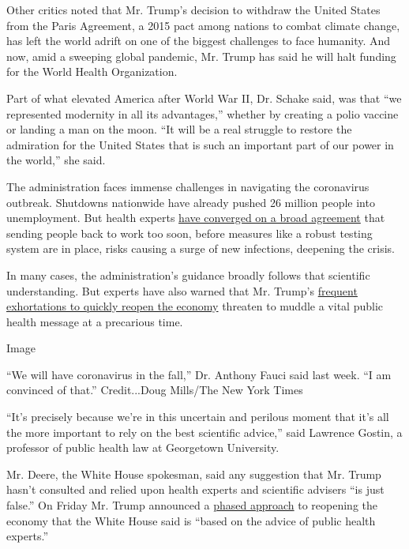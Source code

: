 Other critics noted that Mr. Trump's decision to withdraw the United
States from the Paris Agreement, a 2015 pact among nations to combat
climate change, has left the world adrift on one of the biggest
challenges to face humanity. And now, amid a sweeping global pandemic,
Mr. Trump has said he will halt funding for the World Health
Organization.

Part of what elevated America after World War II, Dr. Schake said, was
that ``we represented modernity in all its advantages,'' whether by
creating a polio vaccine or landing a man on the moon. ``It will be a
real struggle to restore the admiration for the United States that is
such an important part of our power in the world,'' she said.

The administration faces immense challenges in navigating the
coronavirus outbreak. Shutdowns nationwide have already pushed 26
million people into unemployment. But health experts
\href{https://www.nytimes3xbfgragh.onion/2020/04/06/upshot/coronavirus-four-benchmarks-reopening.html}{have
converged on a broad agreement} that sending people back to work too
soon, before measures like a robust testing system are in place, risks
causing a surge of new infections, deepening the crisis.

In many cases, the administration's guidance broadly follows that
scientific understanding. But experts have also warned that Mr. Trump's
\href{https://www.nytimes3xbfgragh.onion/2020/04/12/us/when-lockdown-ending-coronavirus.html}{frequent
exhortations to quickly reopen the economy} threaten to muddle a vital
public health message at a precarious time.

Image

``We will have coronavirus in the fall,'' Dr. Anthony Fauci said last
week. ``I am convinced of that.'' Credit...Doug Mills/The New York Times

``It's precisely because we're in this uncertain and perilous moment
that it's all the more important to rely on the best scientific
advice,'' said Lawrence Gostin, a professor of public health law at
Georgetown University.

Mr. Deere, the White House spokesman, said any suggestion that Mr. Trump
hasn't consulted and relied upon health experts and scientific advisers
``is just false.'' On Friday Mr. Trump announced a
\href{https://twitter.com/whitehouse/status/1254904154977337345}{phased
approach} to reopening the economy that the White House said is ``based
on the advice of public health experts.''

